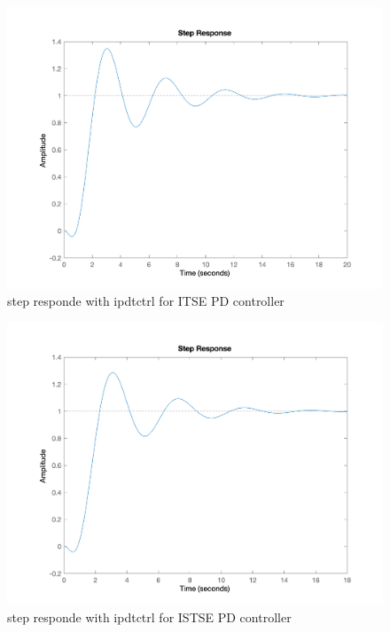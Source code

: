 \begin{figure}[H]
    \caption{step responde with ipdtctrl for ITSE PD controller}
    \centering
    \includegraphics[width=12cm]{../Figure/Q2/pd2.png}
\end{figure}
\begin{figure}[H]
    \caption{step responde with ipdtctrl for ISTSE PD controller}
    \centering
    \includegraphics[width=12cm]{../Figure/Q2/pd3.png}
\end{figure}


